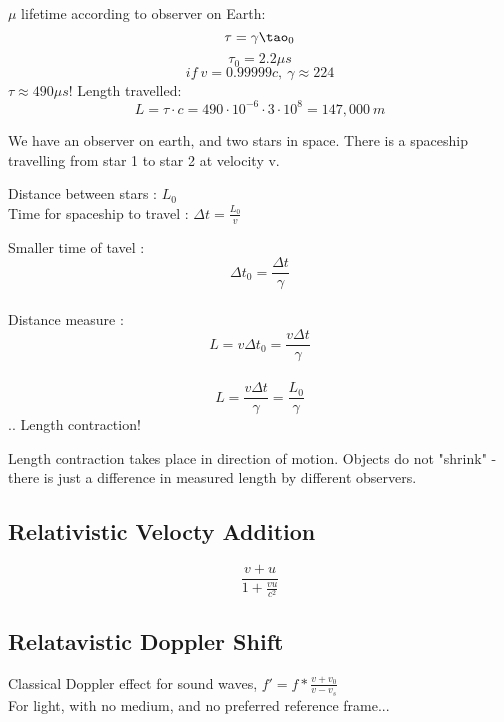 \documentclass[class=article,crop=false]{standalone}
\begin{document}
$\mu$ lifetime according to observer on Earth: \\
$$ \tau = \gamma \tao_0 $$
$$ \tau_0 = 2.2 \mu s $$
$$ if\ v = 0.99999c,\ \gamma \approx 224 $$
$\tau \approx 490 \mu s!$
Length travelled:
$$ L = \tau \cdot c = 490 \cdot 10^{-6} \cdot 3 \cdot 10^8 = 147,000\ m $$
\begin{question}
	We have an observer on earth, and two stars in space. There is a spaceship travelling from star 1 to star 2 at velocity v. \\
	\begin{answer}
		Distance between stars : $L_0$ \\
		Time for spaceship to travel : $\Delta t = \frac{L_0}{v}$\\
	\end{answer}
	\begin{answer}
		Smaller time of tavel : $$\Delta t_0 = \frac{\Delta t}{\gamma}$$ \\
		Distance measure : $$L = v \Delta t_0 = \frac{v \Delta t}{\gamma} $$ \\
		$$ L = \frac{v \Delta t}{\gamma} = \frac{L_0}{\gamma} $$
		.. Length contraction!
	\end{answer}
\end{question}
Length contraction takes place in direction of motion. Objects do not "shrink" - there is just a difference in measured length by different observers.
\subsection{Relativistic Velocty Addition}
$$\frac{v + u}{1 + \frac{vu}{c^2}}$$

\subsection{Relatavistic Doppler Shift}
Classical Doppler effect for sound waves, $f' = f * \frac{v + v_0}{v - v_s}$\\

For light, with no medium, and no preferred reference frame...
\end{document}
